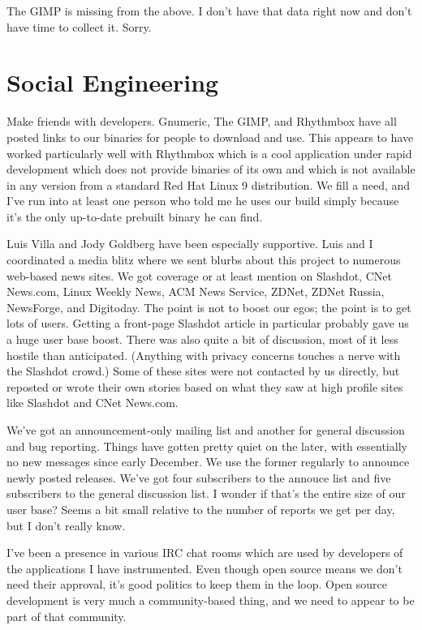 \documentclass[times,10pt,twocolumn]{article}
\begin{document}
The GIMP is missing from the above.  I don't have that data right now
and don't have time to collect it.  Sorry.

\section{Social Engineering}

Make friends with developers.  Gnumeric, The GIMP, and Rhythmbox have
all posted links to our binaries for people to download and use.  This
appears to have worked particularly well with Rhythmbox which is a
cool application under rapid development which does not provide
binaries of its own and which is not available in any version from a
standard Red Hat Linux 9 distribution.  We fill a need, and I've run
into at least one person who told me he uses our build simply because
it's the only up-to-date prebuilt binary he can find.

Luis Villa and Jody Goldberg have been especially supportive.  Luis
and I coordinated a media blitz where we sent blurbs about this
project to numerous web-based news sites.  We got coverage or at least
mention on Slashdot, CNet News.com, Linux Weekly News, ACM News
Service, ZDNet, ZDNet Russia, NewsForge, and Digitoday.  The point is
not to boost our egos; the point is to get lots of users.  Getting a
front-page Slashdot article in particular probably gave us a huge user
base boost.  There was also quite a bit of discussion, most of it less
hostile than anticipated.  (Anything with privacy concerns touches a
nerve with the Slashdot crowd.)  Some of these sites were not
contacted by us directly, but reposted or wrote their own stories
based on what they saw at high profile sites like Slashdot and CNet
News.com.

We've got an announcement-only mailing list and another for general
discussion and bug reporting.  Things have gotten pretty quiet on the
later, with essentially no new messages since early December.  We use
the former regularly to announce newly posted releases.  We've got
four subscribers to the annouce list and five subscribers to the
general discussion list.  I wonder if that's the entire size of our
user base?  Seems a bit small relative to the number of reports we get
per day, but I don't really know.

I've been a presence in various IRC chat rooms which are used by
developers of the applications I have instrumented.  Even though open
source means we don't need their approval, it's good politics to keep
them in the loop.  Open source development is very much a
community-based thing, and we need to appear to be part of that
community.
\end{document}
